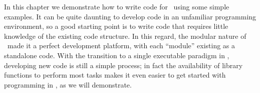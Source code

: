 In this chapter we demonstrate how to write code for \PSIfour\ using some simple
examples.  It can be quite daunting to develop code in an unfamiliar programming
environment, so a good starting point is to write code that requires little
knowledge of the existing code structure.  In this regard, the modular nature
of \PSIthree\ made it a perfect development platform, with each ``module''
existing as a standalone code.  With the transition to a single executable
paradigm in \PSIfour, developing new code is still a simple process; in fact
the availability of library functions to perform most tasks makes it even
easier to get started with programming in \PSIfour, as we will demonstrate.
